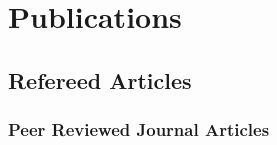\section{Publications}



\vspace{1em}

\subsection{Refereed Articles}
\subsubsection{Peer Reviewed Journal Articles}
  \begin{etaremune}
    \item {}
    \item {}
    \item {}
    \item {}  
    \item {}
    
  \end{etaremune}
  
